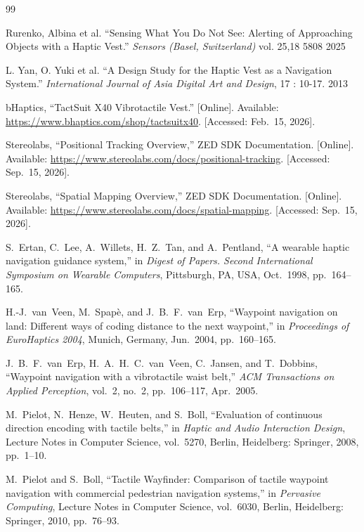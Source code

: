 \documentclass[12pt]{report}
\begin{document}
\begin{thebibliography}{99}

Rurenko, Albina et al. “Sensing What You Do Not See: Alerting of Approaching Objects with a Haptic Vest.” \textit{Sensors (Basel, Switzerland)} vol. 25,18 5808 2025

L. Yan, O. Yuki et al. “A Design Study for the Haptic Vest as a Navigation System.” \textit{International Journal of Asia Digital Art and Design}, 17 : 10-17. 2013

bHaptics, ``TactSuit X40 Vibrotactile Vest.'' [Online]. Available:
\url{https://www.bhaptics.com/shop/tactsuitx40}. [Accessed: Feb.~15, 2026].

Stereolabs, ``Positional Tracking Overview,'' ZED SDK Documentation. [Online]. Available: \url{https://www.stereolabs.com/docs/positional-tracking}. [Accessed: Sep.~15, 2026].

Stereolabs, ``Spatial Mapping Overview,'' ZED SDK Documentation. [Online]. Available: \url{https://www.stereolabs.com/docs/spatial-mapping}. [Accessed: Sep.~15, 2026].

S.~Ertan, C.~Lee, A.~Willets, H.~Z.~Tan, and A.~Pentland,
``A wearable haptic navigation guidance system,''
in \textit{Digest of Papers. Second International Symposium on Wearable Computers},
Pittsburgh, PA, USA, Oct.\ 1998, pp.~164--165.

H.-J.~van~Veen, M.~Spap\`{e}, and J.~B.~F.~van~Erp,
``Waypoint navigation on land: Different ways of coding distance to the next waypoint,''
in \textit{Proceedings of EuroHaptics 2004},
Munich, Germany, Jun.\ 2004, pp.~160--165.

J.~B.~F.~van~Erp, H.~A.~H.~C.~van~Veen, C.~Jansen, and T.~Dobbins,
``Waypoint navigation with a vibrotactile waist belt,''
\textit{ACM Transactions on Applied Perception},
vol.~2, no.~2, pp.~106--117, Apr.\ 2005.

M.~Pielot, N.~Henze, W.~Heuten, and S.~Boll,
``Evaluation of continuous direction encoding with tactile belts,''
in \textit{Haptic and Audio Interaction Design},
Lecture Notes in Computer Science, vol.~5270,
Berlin, Heidelberg: Springer, 2008, pp.~1--10.

M.~Pielot and S.~Boll,
``Tactile Wayfinder: Comparison of tactile waypoint navigation with commercial pedestrian navigation systems,''
in \textit{Pervasive Computing},
Lecture Notes in Computer Science, vol.~6030,
Berlin, Heidelberg: Springer, 2010, pp.~76--93.


\end{thebibliography}
\end{document}
